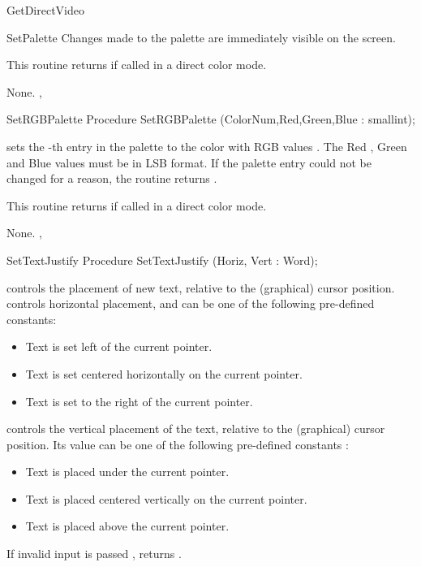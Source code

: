 \begin{function}{GetDirectVideo}
\begin{procedure}{SetPalette}
Changes made to the palette are immediately visible on the screen.

This routine returns  if called in a direct color mode.

\Errors
None.
\SeeAlso
{},
\end{procedure}
\begin{procedure}{SetRGBPalette}
\Declaration
Procedure SetRGBPalette (ColorNum,Red,Green,Blue : smallint);

\Description
{} sets the -th entry in the palette to the
color with RGB values . The Red , Green and Blue values
must be in LSB format. If the palette entry could not be changed for a
reason, the routine returns .

This routine returns  if called in a direct color mode.

\Errors
None.
\SeeAlso
{},
\end{procedure}
\begin{procedure}{SetTextJustify}
\Declaration
Procedure SetTextJustify (Horiz, Vert : Word);

\Description
{} controls the placement of new text, relative to the
(graphical) cursor position.  controls horizontal placement, and can be
one of the following pre-defined constants:
\begin{itemize}
\item {} Text is set left of the current pointer.
\item {} Text is set centered horizontally on the current pointer.
\item {} Text is set to the right of the current pointer.
\end{itemize}
 controls the vertical placement of the text, relative to the
(graphical) cursor position. Its value can be one of the following
pre-defined constants :
\begin{itemize}
\item {} Text is placed under the current pointer.
\item {} Text is placed centered vertically on the current pointer.
\item {}Text is placed above the current pointer.
\end{itemize}

If invalid input is passed  ,  returns
.


\end{procedure}
\end{function}
